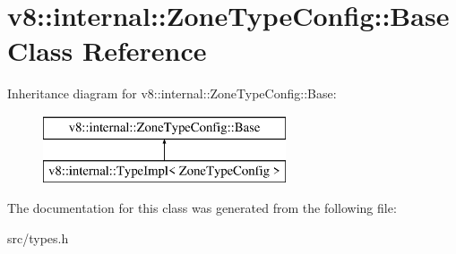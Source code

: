 \hypertarget{classv8_1_1internal_1_1_zone_type_config_1_1_base}{}\section{v8\+:\+:internal\+:\+:Zone\+Type\+Config\+:\+:Base Class Reference}
\label{classv8_1_1internal_1_1_zone_type_config_1_1_base}
Inheritance diagram for v8\+:\+:internal\+:\+:Zone\+Type\+Config\+:\+:Base\+:\begin{figure}[H]
\begin{center}
\leavevmode
\includegraphics[height=2.000000cm]{classv8_1_1internal_1_1_zone_type_config_1_1_base}
\end{center}
\end{figure}


The documentation for this class was generated from the following file\+:\begin{DoxyCompactItemize}
\item 
src/types.\+h\end{DoxyCompactItemize}
